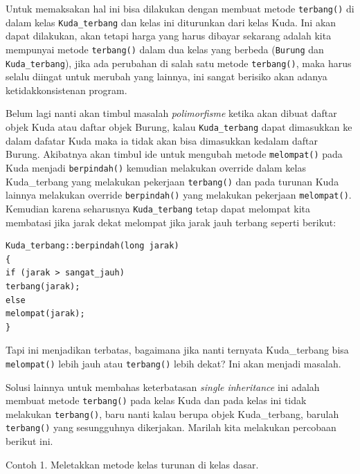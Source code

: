 Untuk memaksakan hal ini bisa dilakukan dengan membuat metode
\texttt{terbang()} di dalam kelas \texttt{Kuda\_terbang} dan kelas ini
diturunkan dari kelas Kuda. Ini akan dapat dilakukan, akan tetapi harga
yang harus dibayar sekarang adalah kita mempunyai metode
\texttt{terbang()} dalam dua kelas yang berbeda (\texttt{Burung} dan
\texttt{Kuda\_terbang}), jika ada perubahan di salah satu metode
\texttt{terbang()}, maka harus selalu diingat untuk merubah yang
lainnya, ini sangat berisiko akan adanya ketidakkonsistenan program.

Belum lagi nanti akan timbul masalah \emph{polimorfisme} ketika akan
dibuat daftar objek Kuda atau daftar objek Burung, kalau
\texttt{Kuda\_terbang} dapat dimasukkan ke dalam dafatar Kuda maka ia
tidak akan bisa dimasukkan kedalam daftar Burung. Akibatnya akan timbul
ide untuk mengubah metode \texttt{melompat()} pada Kuda menjadi
\texttt{berpindah()} kemudian melakukan override dalam kelas
Kuda\_terbang yang melakukan pekerjaan \texttt{terbang()} dan pada
turunan Kuda lainnya melakukan override \texttt{berpindah()} yang
melakukan pekerjaan \texttt{melompat()}. Kemudian karena seharusnya
\texttt{Kuda\_terbang} tetap dapat melompat kita membatasi jika jarak
dekat melompat jika jarak jauh terbang seperti berikut:

\begin{verbatim}
Kuda_terbang::berpindah(long jarak)
{
if (jarak > sangat_jauh)
terbang(jarak);
else
melompat(jarak);
}
\end{verbatim}

Tapi ini menjadikan terbatas, bagaimana jika nanti ternyata
Kuda\_terbang bisa \texttt{melompat()} lebih jauh atau
\texttt{terbang()} lebih dekat? Ini akan menjadi masalah.

Solusi lainnya untuk membahas keterbatasan \emph{single inheritance} ini
adalah membuat metode \texttt{terbang()} pada kelas Kuda dan pada kelas
ini tidak melakukan \texttt{terbang()}, baru nanti kalau berupa objek
Kuda\_terbang, barulah \texttt{terbang()} yang sesungguhnya dikerjakan.
Marilah kita melakukan percobaan berikut ini.

Contoh 1. Meletakkan metode kelas turunan di kelas dasar.

